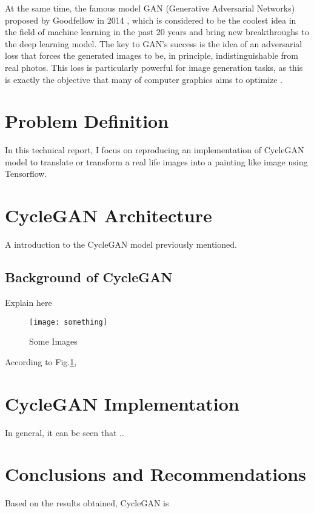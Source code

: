 \documentclass[peerreview]{IEEEtran}
\begin{document}
At the same time, the famous model GAN (Generative Adversarial Networks) proposed by Goodfellow in 2014 \cite{goodfellow2014generative}, which is considered to be the coolest idea in the field of machine learning in the past 20 years and bring new breakthroughs to the deep learning model. The key to GAN's success is the idea of an adversarial loss that forces the generated images to be, in principle, indistinguishable from real photos. This loss is particularly powerful for image generation tasks, as this is exactly the objective that many of computer graphics aims to optimize \cite{zhu2019brief}.


\section{Problem Definition}
In this technical report, I focus on reproducing an implementation of CycleGAN model to translate or transform a real life images into a painting like image using Tensorflow.


\section{CycleGAN Architecture}
A introduction to the CycleGAN model previously mentioned.

\subsection{Background of CycleGAN}
Explain here

\begin{figure}[H]
    \centering
    \texttt{[image: something]}
    \caption{Some Images}
    \label{fig:something}
\end{figure}

According to Fig.\ref{fig:something}, 



\section{CycleGAN Implementation}
In general, it can be seen that ..


\section{Conclusions and Recommendations}
Based on the results obtained, CycleGAN is

\end{document}
